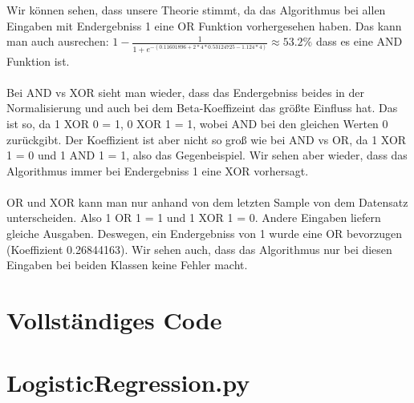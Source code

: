 Wir können sehen, dass unsere Theorie stimmt, da das Algorithmus bei allen Eingaben mit Endergebniss 1 eine OR
Funktion vorhergesehen haben. Das kann man auch ausrechen:
$ 1 - \frac{1}{1 + e^{-(0.11601896 +2*4*0.53124725 -1.124*4)}}  \approx 53.2\%$ dass es eine AND Funktion ist. \\\\

Bei AND vs XOR sieht man wieder, dass das Endergebniss beides in der Normalisierung und auch bei dem Beta-Koeffizeint
das größte Einfluss hat. Das ist so, da 1 XOR 0 = 1, 0 XOR 1 = 1, wobei AND bei den gleichen Werten 0 zurückgibt.
Der Koeffizient ist aber nicht so groß wie bei AND vs OR, da 1 XOR 1 = 0 und 1 AND 1 = 1, also das Gegenbeispiel.
Wir sehen aber wieder, dass das Algorithmus immer bei Endergebniss 1 eine XOR vorhersagt. \\\\

OR und XOR kann man nur anhand von dem letzten Sample von dem Datensatz unterscheiden. Also
1 OR 1 = 1 und 1 XOR 1 = 0. Andere Eingaben liefern gleiche Ausgaben. Deswegen, ein Endergebniss von 1 wurde
eine OR bevorzugen (Koeffizient 0.26844163). Wir sehen auch, dass das Algorithmus nur bei diesen Eingaben
bei beiden Klassen keine Fehler macht.

\section*{Vollständiges Code}

\section*{LogisticRegression.py}

